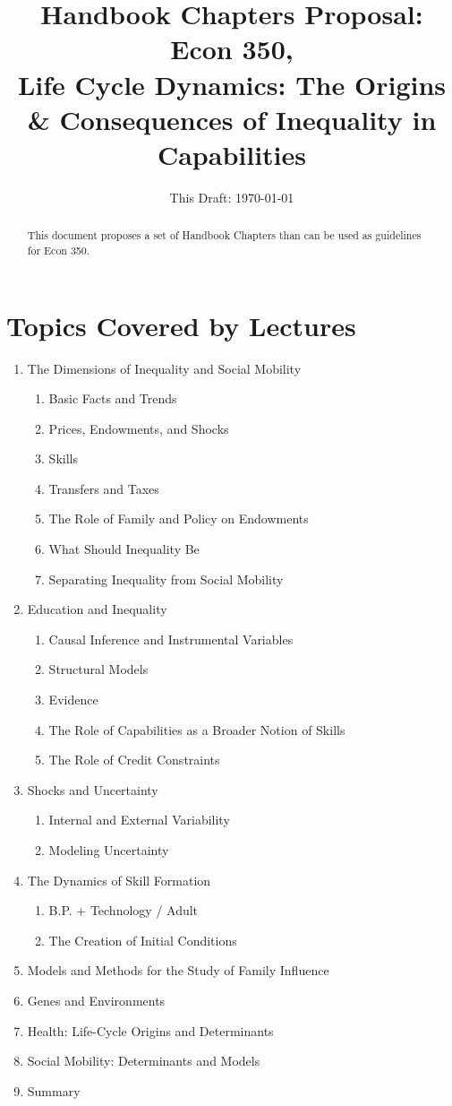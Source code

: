 \documentclass[12pt]{article}
\begin{document}
\title{\textbf{Handbook Chapters Proposal: Econ 350,\\ Life Cycle Dynamics: The Origins \& Consequences of Inequality in Capabilities}}
\date{This Draft: \today}
\maketitle

\begin{abstract}
\noindent This document proposes a set of Handbook Chapters than can be used as guidelines for Econ 350.
\end{abstract}

\section{Topics Covered by Lectures}
\begin{enumerate}
\item The Dimensions of Inequality and Social Mobility
\begin{enumerate}
\item Basic Facts and Trends
\item Prices, Endowments, and Shocks
\item Skills
\item Transfers and Taxes
\item The Role of Family and Policy on Endowments
\item What Should Inequality Be
\item Separating Inequality from Social Mobility
\end{enumerate}
\item Education and Inequality
\begin{enumerate}
\item Causal Inference and Instrumental Variables
\item Structural Models
\item Evidence
\item The Role of Capabilities as a Broader Notion of Skills
\item The Role of Credit Constraints
\end{enumerate}
\item Shocks and Uncertainty
\begin{enumerate}
\item Internal and External Variability
\item Modeling Uncertainty
\end{enumerate}
\item The Dynamics of Skill Formation
\begin{enumerate}
\item B.P. + Technology / Adult
\item The Creation of Initial Conditions
\end{enumerate}
\item Models and Methods for the Study of Family Influence
\item Genes and Environments
\item Health: Life-Cycle Origins and Determinants
\item Social Mobility: Determinants and Models
\item Summary
\end{enumerate}
\end{document}
